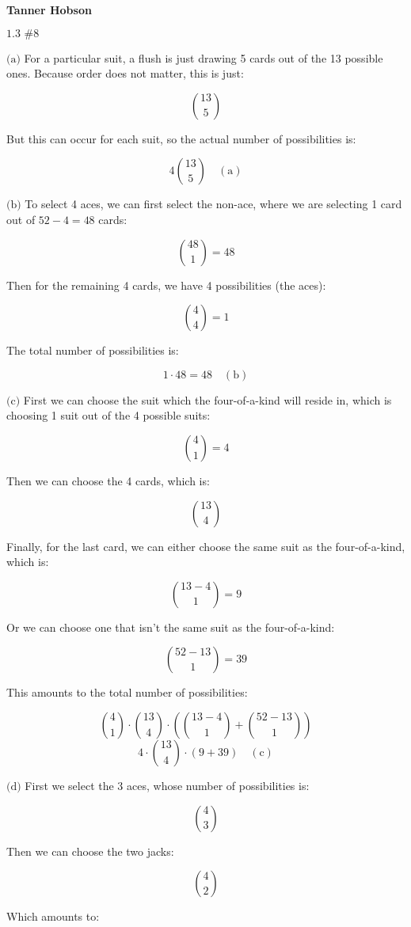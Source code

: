 \documentclass{article}
\newcommand{\problem}[2]{$\boxed{\text{#1 \##2}}$}
\newcommand{\subproblem}[1]{$\boxed{\text{(#1)}}$}
\newcommand{\subsolution}[2]{\boxed{#2\quad(\text{#1})}}
\begin{document}
\begin{multicols*}{2}

\textbf{Tanner Hobson}

%
\problem{1.3}{8}

%
\subproblem{a} For a particular suit, a flush is just drawing 5 cards
out of the 13 possible ones. Because order does not matter, this is
just:

\[
\binom{13}{5}
\]

But this can occur for each suit, so the actual number of
possibilities is:

\[
\subsolution{a}{4\binom{13}{5}}
\]

%
\subproblem{b} To select 4 aces, we can first select the non-ace,
where we are selecting 1 card out of $52-4=48$ cards:

\[
\binom{48}{1}=48
\]

Then for the remaining 4 cards, we have 4 possibilities (the aces):

\[
\binom{4}{4}=1
\]

The total number of possibilities is:

\[
\subsolution{b}{1\cdot48=48}
\]

%
\subproblem{c} First we can choose the suit which the four-of-a-kind
will reside in, which is choosing 1 suit out of the 4 possible suits:

\[
\binom{4}{1}=4
\]

Then we can choose the 4 cards, which is:

\[
\binom{13}{4}
\]

Finally, for the last card, we can either choose the same suit as the
four-of-a-kind, which is:

\[
\binom{13-4}{1}=9
\]

Or we can choose one that isn't the same suit as the four-of-a-kind:

\[
\binom{52-13}{1}=39
\]

This amounts to the total number of possibilities:

\[
\binom{4}{1}\cdot\binom{13}{4}\cdot\left(\binom{13-4}{1}+\binom{52-13}{1}\right)
\] \[
\subsolution{c}{4\cdot\binom{13}{4}\cdot\left(9+39\right)}
\]

%
\subproblem{d} First we select the 3 aces, whose number of
possibilities is:

\[
\binom{4}{3}
\]

Then we can choose the two jacks:

\[
\binom{4}{2}
\]

Which amounts to:


\end{multicols*}
\end{document}
